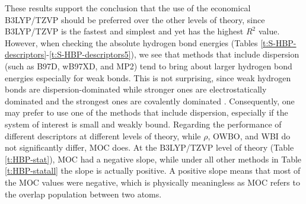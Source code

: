 \documentclass[11pt]{report}
\begin{document}
These results support the conclusion that the use of the
economical B3LYP/TZVP should be preferred over the other levels of theory, since B3LYP/TZVP is the fastest and simplest and yet has the highest $R^2$ value. However, when checking the absolute hydrogen bond energies 
(Tables \ref{t:S-HBP-descriptors}-\ref{t:S-HBP-descriptors5}), 
we see that methods that include dispersion (such as B97D, wB97XD, and MP2) tend to bring about larger hydrogen bond energies especially for weak bonds. This is not surprising, since weak hydrogen bonds are dispersion-dominated while stronger ones are electrostatically dominated and the strongest ones are covalently dominated \cite{Desiraju2002}. 
Consequently, one may prefer to use one of the methods that include dispersion, especially if the system of interest is small and weakly bound. Regarding the performance of different descriptors at different levels of theory, while $\rho$, OWBO, and WBI do not significantly differ, MOC does. At the B3LYP/TZVP level of theory (Table \ref{t:HBP-stat}), 
MOC had a negative slope, while under all other methods in Table
\ref{t:HBP-statall} 
the slope is actually positive. A positive slope means that most of the MOC values were negative, which is physically meaningless as MOC refers to the overlap population between two atoms.
\end{document}
